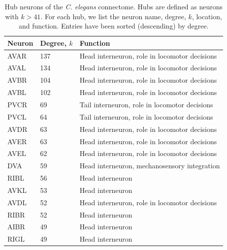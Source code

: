 \documentclass[10pt,letterpaper]{article}
\begin{document}
\begin{table}[h]
\centering
\caption{Hub neurons of the \textit{C. elegans} connectome.
Hubs are defined as neurons with $k>41$.
For each hub, we list the neuron name, degree, $k$, location, and function.
Entries have been sorted (descending) by degree.}
\label{tab:HubList}
\begin{tabular}{lll}
\hline
\textbf{Neuron} & \textbf{Degree, $k$} & \textbf{Function}                         \\ \hline
AVAR   & 137        & Head interneuron, role in locomotor decisions                \\
AVAL   & 134        & Head interneuron, role in locomotor decisions                \\
AVBR   & 104        & Head interneuron, role in locomotor decisions                \\
AVBL   & 102        & Head interneuron, role in locomotor decisions                \\
PVCR   & 69         & Tail interneuron, role in locomotor decisions                \\
PVCL   & 64         & Tail interneuron, role in locomotor decisions                \\
AVDR   & 63         & Head interneuron, role in locomotor decisions 				\\
AVER   & 63         & Head interneuron, role in locomotor decisions                \\
AVEL   & 62         & Head interneuron, role in locomotor decisions                \\
DVA    & 59         & Head interneuron, mechanosensory integration                \\
RIBL   & 56         & Head interneuron                							\\
AVKL   & 53         & Head interneuron                                             \\
AVDL   & 52         & Head interneuron, role in locomotor decisions                 \\
RIBR   & 52         & Head interneuron                                             \\
AIBR   & 49         & Head interneuron                                             \\
RIGL   & 49         & Head interneuron                                             \\\hline
\end{tabular}
\end{table}
\end{document}
